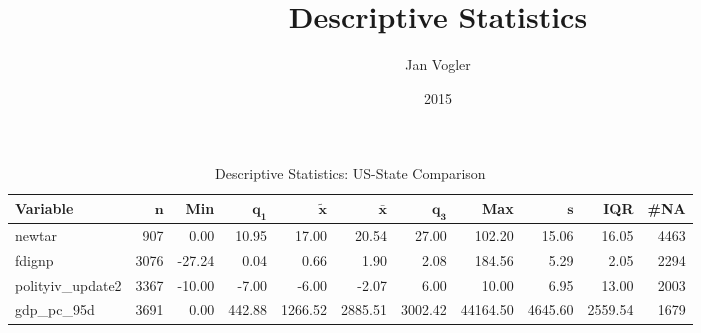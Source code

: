 \documentclass[12pt]{article}
\begin{document}
\title{Descriptive Statistics}

\author{Jan Vogler}

\date{2015}
 
\maketitle 



\begin{table}[ht]
	\centering
	{\footnotesize
		\begin{tabular}{lrrrrrrrrrr}
			\textbf{Variable} & $\mathbf{n}$ & \textbf{Min} & $\mathbf{q_1}$ & $\mathbf{\widetilde{x}}$ & $\mathbf{\bar{x}}$ & $\mathbf{q_3}$ & \textbf{Max} & $\mathbf{s}$ & \textbf{IQR} & \textbf{\#NA} \\ 
			\hline
			newtar &  907 &   0.00 &  10.95 &   17.00 &   20.54 &   27.00 &   102.20 &   15.06 &   16.05 & 4463 \\ 
			fdignp & 3076 & -27.24 &   0.04 &    0.66 &    1.90 &    2.08 &   184.56 &    5.29 &    2.05 & 2294 \\ 
			polityiv\_update2 & 3367 & -10.00 &  -7.00 &   -6.00 &   -2.07 &    6.00 &    10.00 &    6.95 &   13.00 & 2003 \\ 
			gdp\_pc\_95d & 3691 &   0.00 & 442.88 & 1266.52 & 2885.51 & 3002.42 & 44164.50 & 4645.60 & 2559.54 & 1679 \\ 
		\end{tabular}
	}
	\caption{Descriptive Statistics: US-State Comparison} 
	\label{tab: cont1}
\end{table}
\end{document}

